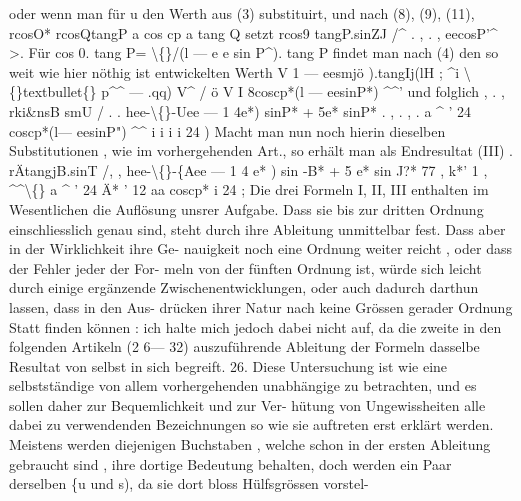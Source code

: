 \documentclass[12pt,a4paper]{article}
\begin{document}
oder  wenn  man  für  u  den  Werth  aus  (3)  substituirt,  und  nach  (8),  (9),  (11), rcosO*     rcosQtangP a  cos  cp  a  tang  Q setzt rcos9  tangP.sinZJ /\^{}    .      ,  .      ,  eecosP'\^{}  >. Für  cos 0.  tang P=  \textbackslash\{\}/(l --- e e sin P\^{}).  tang P  findet  man  nach  (4)  den  so  weit  wie hier  nöthig  ist  entwickelten  Werth V  1  ---  eesmjö  ).tangIj(lH   ;  \^{}i   \textbackslash\{\}textbullet\{\}   p\^{}\^{} --- .qq) V\^{}  /  ö       V       I  8coscp*(l --- eesinP*)  \^{}\^{}' und  folglich  ,    . ,  rki\&nsB  smU  / .    .    hee-\textbackslash\{\}-Uee --- 1  4e*)  sinP*  +  5e*  sinP*  .       ,  .      ,  . a  \^{}      '  24  coscp*(l--- eesinP")  \^{}\^{}    i     i  i  i     24        ) Macht  man  nun  noch  hierin  dieselben  Substitutionen ,   wie  im  vorhergehenden Art.,   so  erhält  man  als  Endresultat  (III) .  rÄtangjB.sinT /,     ,     hee-\textbackslash\{\}-\{Aee  ---  1 4  e* )  sin -B*  +  5  e*  sin  J?*    77     ,  k*'  1       ,    \^{}\^{}\textbackslash\{\} a  \^{}      '  24  Ä*  '    12  aa  coscp*  i     24       ; Die  drei  Formeln  I,  II,  III  enthalten  im  Wesentlichen  die  Auflösung  unsrer Aufgabe.  Dass  sie  bis  zur  dritten  Ordnung  einschliesslich  genau  sind,  steht durch  ihre  Ableitung  unmittelbar  fest.  Dass  aber  in  der  Wirklichkeit  ihre  Ge- nauigkeit noch  eine  Ordnung  weiter  reicht ,  oder  dass  der  Fehler  jeder  der  For- meln von  der  fünften  Ordnung  ist,  würde  sich  leicht  durch  einige  ergänzende Zwischenentwicklungen,  oder  auch  dadurch  darthun  lassen,  dass  in  den  Aus- drücken ihrer  Natur  nach  keine  Grössen  gerader  Ordnung  Statt  finden  können : ich  halte  mich  jedoch  dabei  nicht  auf,  da  die  zweite  in  den  folgenden  Artikeln (2  6---  32)  auszuführende  Ableitung  der  Formeln  dasselbe  Resultat  von  selbst  in sich  begreift. 26. Diese  Untersuchung  ist  wie  eine  selbstständige  von  allem  vorhergehenden unabhängige  zu  betrachten,  und  es  sollen  daher  zur  Bequemlichkeit  und  zur  Ver- hütung von  Ungewissheiten  alle  dabei  zu  verwendenden  Bezeichnungen  so  wie  sie auftreten  erst  erklärt  werden.  Meistens  werden  diejenigen  Buchstaben ,  welche schon  in  der  ersten  Ableitung  gebraucht  sind ,  ihre  dortige  Bedeutung  behalten, doch  werden  ein  Paar  derselben  \{u  und  s),  da  sie  dort  bloss  Hülfsgrössen  vorstel-
\end{document}
